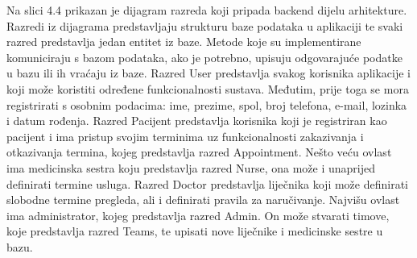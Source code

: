 			
			
			
			Na slici 4.4 prikazan je dijagram razreda koji pripada backend dijelu arhitekture. Razredi iz dijagrama predstavljaju strukturu baze podataka u aplikaciji te svaki razred predstavlja jedan entitet iz baze. Metode koje su implementirane komuniciraju s bazom podataka, ako je potrebno, upisuju odgovarajuće podatke u bazu ili ih vraćaju iz baze. Razred User predstavlja svakog korisnika aplikacije i koji može koristiti određene funkcionalnosti sustava. Međutim, prije toga se mora registrirati s osobnim podacima: ime, prezime, spol, broj telefona, e-mail, lozinka i datum rođenja. Razred Pacijent predstavlja korisnika koji je registriran kao pacijent i ima pristup svojim terminima uz funkcionalnosti zakazivanja i otkazivanja termina, kojeg predstavlja razred Appointment. Nešto veću ovlast ima medicinska sestra koju predstavlja razred Nurse, ona može i unaprijed definirati termine usluga. Razred Doctor predstavlja liječnika koji može definirati slobodne termine pregleda, ali i definirati pravila za naručivanje. Najvišu ovlast ima administrator, kojeg predstavlja razred Admin. On može stvarati timove, koje predstavlja razred Teams, te upisati nove liječnike i medicinske sestre u bazu.
			
